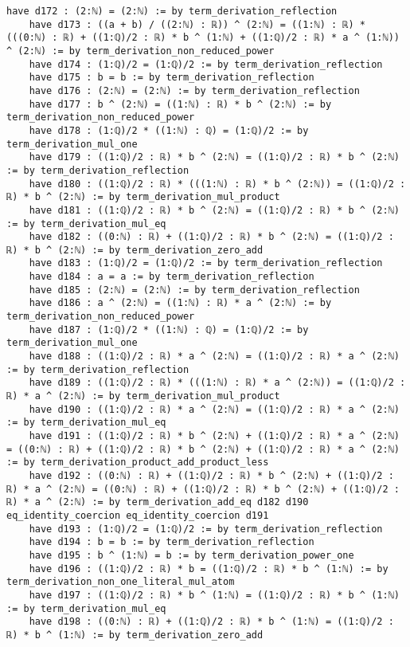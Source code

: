 \documentclass{article}
\begin{document}
\begin{tcolorbox}[colback=white!10, width=\linewidth]
\begin{lstlisting}[language=Lean4]
    have d172 : (2:ℕ) = (2:ℕ) := by term_derivation_reflection
    have d173 : ((a + b) / ((2:ℕ) : ℝ)) ^ (2:ℕ) = ((1:ℕ) : ℝ) * (((0:ℕ) : ℝ) + ((1:ℚ)/2 : ℝ) * b ^ (1:ℕ) + ((1:ℚ)/2 : ℝ) * a ^ (1:ℕ)) ^ (2:ℕ) := by term_derivation_non_reduced_power
    have d174 : (1:ℚ)/2 = (1:ℚ)/2 := by term_derivation_reflection
    have d175 : b = b := by term_derivation_reflection
    have d176 : (2:ℕ) = (2:ℕ) := by term_derivation_reflection
    have d177 : b ^ (2:ℕ) = ((1:ℕ) : ℝ) * b ^ (2:ℕ) := by term_derivation_non_reduced_power
    have d178 : (1:ℚ)/2 * ((1:ℕ) : ℚ) = (1:ℚ)/2 := by term_derivation_mul_one
    have d179 : ((1:ℚ)/2 : ℝ) * b ^ (2:ℕ) = ((1:ℚ)/2 : ℝ) * b ^ (2:ℕ) := by term_derivation_reflection
    have d180 : ((1:ℚ)/2 : ℝ) * (((1:ℕ) : ℝ) * b ^ (2:ℕ)) = ((1:ℚ)/2 : ℝ) * b ^ (2:ℕ) := by term_derivation_mul_product
    have d181 : ((1:ℚ)/2 : ℝ) * b ^ (2:ℕ) = ((1:ℚ)/2 : ℝ) * b ^ (2:ℕ) := by term_derivation_mul_eq
    have d182 : ((0:ℕ) : ℝ) + ((1:ℚ)/2 : ℝ) * b ^ (2:ℕ) = ((1:ℚ)/2 : ℝ) * b ^ (2:ℕ) := by term_derivation_zero_add
    have d183 : (1:ℚ)/2 = (1:ℚ)/2 := by term_derivation_reflection
    have d184 : a = a := by term_derivation_reflection
    have d185 : (2:ℕ) = (2:ℕ) := by term_derivation_reflection
    have d186 : a ^ (2:ℕ) = ((1:ℕ) : ℝ) * a ^ (2:ℕ) := by term_derivation_non_reduced_power
    have d187 : (1:ℚ)/2 * ((1:ℕ) : ℚ) = (1:ℚ)/2 := by term_derivation_mul_one
    have d188 : ((1:ℚ)/2 : ℝ) * a ^ (2:ℕ) = ((1:ℚ)/2 : ℝ) * a ^ (2:ℕ) := by term_derivation_reflection
    have d189 : ((1:ℚ)/2 : ℝ) * (((1:ℕ) : ℝ) * a ^ (2:ℕ)) = ((1:ℚ)/2 : ℝ) * a ^ (2:ℕ) := by term_derivation_mul_product
    have d190 : ((1:ℚ)/2 : ℝ) * a ^ (2:ℕ) = ((1:ℚ)/2 : ℝ) * a ^ (2:ℕ) := by term_derivation_mul_eq
    have d191 : ((1:ℚ)/2 : ℝ) * b ^ (2:ℕ) + ((1:ℚ)/2 : ℝ) * a ^ (2:ℕ) = ((0:ℕ) : ℝ) + ((1:ℚ)/2 : ℝ) * b ^ (2:ℕ) + ((1:ℚ)/2 : ℝ) * a ^ (2:ℕ) := by term_derivation_product_add_product_less
    have d192 : ((0:ℕ) : ℝ) + ((1:ℚ)/2 : ℝ) * b ^ (2:ℕ) + ((1:ℚ)/2 : ℝ) * a ^ (2:ℕ) = ((0:ℕ) : ℝ) + ((1:ℚ)/2 : ℝ) * b ^ (2:ℕ) + ((1:ℚ)/2 : ℝ) * a ^ (2:ℕ) := by term_derivation_add_eq d182 d190 eq_identity_coercion eq_identity_coercion d191
    have d193 : (1:ℚ)/2 = (1:ℚ)/2 := by term_derivation_reflection
    have d194 : b = b := by term_derivation_reflection
    have d195 : b ^ (1:ℕ) = b := by term_derivation_power_one
    have d196 : ((1:ℚ)/2 : ℝ) * b = ((1:ℚ)/2 : ℝ) * b ^ (1:ℕ) := by term_derivation_non_one_literal_mul_atom
    have d197 : ((1:ℚ)/2 : ℝ) * b ^ (1:ℕ) = ((1:ℚ)/2 : ℝ) * b ^ (1:ℕ) := by term_derivation_mul_eq
    have d198 : ((0:ℕ) : ℝ) + ((1:ℚ)/2 : ℝ) * b ^ (1:ℕ) = ((1:ℚ)/2 : ℝ) * b ^ (1:ℕ) := by term_derivation_zero_add

\end{lstlisting}
\end{tcolorbox}
\end{document}
